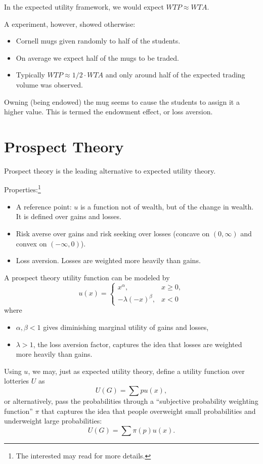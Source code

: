 \documentclass[oneside,reqno,letterpaper]{amsart}
\begin{document}
In the expected utility framework, we would expect \(WTP \approx WTA\).

A \Textcite{Kahneman1991Endowment} experiment, however, showed otherwise:
\begin{itemize}
  \item Cornell mugs given randomly to half of the students. 
  \item On average we expect half of the mugs to be traded.
  \item Typically \(WTP \approx 1 / 2 \cdot WTA\) and only around half of the expected trading volume was observed. 
\end{itemize}
Owning (being endowed) the mug seems to cause the students to assign it a higher value.
This is termed the endowment effect, or loss aversion.



\section{Prospect Theory}
Prospect theory is the leading alternative to expected utility theory.

Properties:\footnote{The interested may read \textcite{kahneman2013prospect} for more details.}
\begin{itemize}
  \item A reference point: \(u\) is a function not of wealth, but of the change in wealth. 
    It is defined over gains and losses.
  \item Risk averse over gains and risk seeking over losses (concave on \((0, \infty)\) and convex on \((-\infty, 0)\)).
  \item Loss aversion. 
    Losses are weighted more heavily than gains.
\end{itemize}
A prospect theory utility function can be modeled by
\[
  u(x) = \begin{cases}
    x^{\alpha}, & x \geq 0, \\ 
    -\lambda (-x)^{\beta}, & x < 0
  \end{cases}
\] 
where
\begin{itemize}
  \item \(\alpha, \beta < 1\) gives diminishing marginal utility of gains and losses,
  \item \(\lambda > 1\), the loss aversion factor, captures the idea that losses are weighted more heavily than gains.
\end{itemize}

Using \(u\), we may, just as expected utility theory, define a utility function over lotteries \(U\) as 
\[
  U(G) = \sum p u(x),
\] 
or alternatively, pass the probabilities through a ``subjective probability weighting function'' \(\pi\) that captures the idea that people overweight small probabilities and underweight large probabilities:
\[
  U(G) = \sum \pi(p) u(x).
\] 
\end{document}
